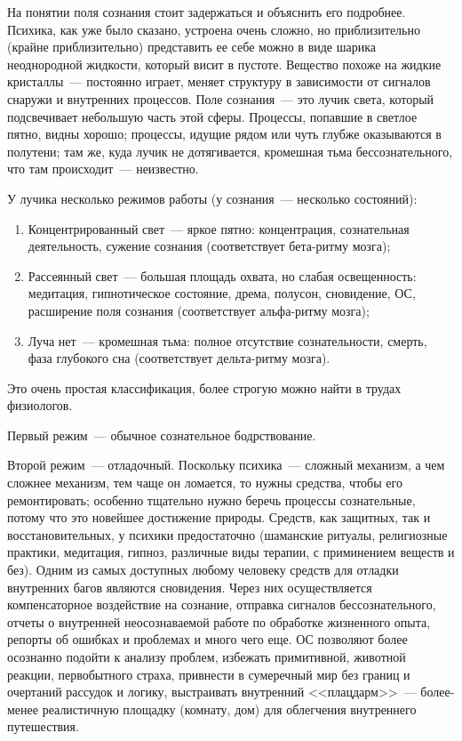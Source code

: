 \documentclass[a4paper,14pt,oneside]{memoir}
\begin{document}
На понятии поля сознания стоит задержаться и объяснить его подробнее. Психика, как уже было сказано, устроена очень сложно, но приблизительно (крайне приблизительно) представить ее себе можно в виде шарика неоднородной жидкости, который висит в пустоте. Вещество похоже на жидкие кристаллы~--- постоянно играет, меняет структуру в зависимости от сигналов снаружи и внутренних процессов. Поле сознания~--- это лучик света, который подсвечивает небольшую часть этой сферы. Процессы, попавшие в светлое пятно, видны хорошо; процессы, идущие рядом или чуть глубже оказываются в полутени; там же, куда лучик не дотягивается, кромешная тьма бессознательного, что там происходит~--- неизвестно.

У лучика несколько режимов работы (у сознания~--- несколько состояний):

\begin{enumerate}
\item Концентрированный свет~--- яркое пятно: концентрация, сознательная деятельность, сужение сознания (соответствует бета-ритму мозга);
\item Рассеянный свет~--- большая площадь охвата, но слабая освещенность: медитация, гипнотическое состояние, дрема, полусон, сновидение, ОС, расширение поля сознания (соответствует альфа-ритму мозга);
\item Луча нет~--- кромешная тьма: полное отсутствие сознательности, смерть, фаза глубокого сна (соответствует дельта-ритму мозга).
\end{enumerate}

Это очень простая классификация, более строгую можно найти в трудах физиологов.

Первый режим~--- обычное сознательное бодрствование.

Второй режим~--- отладочный. Поскольку психика~--- сложный механизм, а чем сложнее механизм, тем чаще он ломается, то нужны средства, чтобы его ремонтировать; особенно тщательно нужно беречь процессы сознательные, потому что это новейшее достижение природы. Средств, как защитных, так и восстановительных, у психики предостаточно (шаманские ритуалы, религиозные практики, медитация, гипноз, различные виды терапии, с приминением веществ и без). Одним из самых доступных любому человеку средств для отладки внутренних багов являются сновидения. Через них осуществляется компенсаторное воздействие на сознание, отправка сигналов бессознательного, отчеты о внутренней неосознаваемой работе по обработке жизненного опыта, репорты об ошибках и проблемах и много чего еще. ОС позволяют более осознанно подойти к анализу проблем, избежать примитивной, животной реакции, первобытного страха, привнести в сумеречный мир без границ и очертаний рассудок и логику, выстраивать внутренний <<плацдарм>>~--- более-менее реалистичную площадку (комнату, дом) для облегчения внутреннего путешествия.
\end{document}
